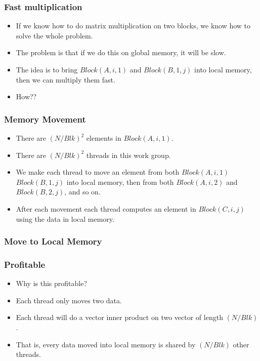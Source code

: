 \documentclass{beamer}
\begin{document}
\begin{frame}
  \frametitle{Fast multiplication}
  \begin{itemize}
    \item If we know how to do matrix multiplication on two blocks, we
      know how to solve the whole problem.
    \item The problem is that if we do this on global memory, it will
      be slow.
    \item The idea is to bring $Block(A, i, 1)$ and $Block(B, 1,
      j)$ into local memory, then we can multiply them fast.
    \item How??
  \end{itemize}
\end{frame}

\begin{frame}
  \frametitle{Memory Movement}
  \begin{itemize}
  \item There are $(N / Blk)^2$ elements in $Block(A, i, 1)$.
  \item There are $(N / Blk)^2$ threads in this work group.
  \item We make each thread to move an element from both $Block(A, i,
    1)$ $Block(B, 1, j)$ into local memory, then from both $Block(A,
    i, 2)$ and $Block(B, 2, j)$, and so on.
  \item After each movement each thread computes an element in
    $Block(C, i, j)$ using the data in local memory.
  \end{itemize}
\end{frame}

\begin{frame}
  \frametitle{Move to Local Memory}
  \centerline{}
\end{frame}

\begin{frame}
  \frametitle{Profitable}
  \begin{itemize}
    \item Why is this profitable?
    \item Each thread only moves two data.
    \item Each thread will do a vector inner product on two vector of
      length $(N / Blk)$.
    \item That is, every data moved into local memory is shared by
      $(N / Blk)$ other threads.
  \end{itemize}
\end{frame}
\end{document}

